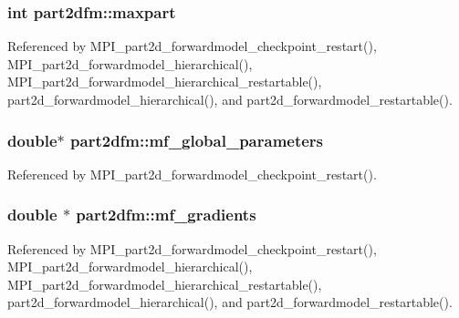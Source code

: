 \subsubsection[{\texorpdfstring{maxpart}{maxpart}}]{\setlength{\rightskip}{0pt plus 5cm}int part2dfm\+::maxpart}\hypertarget{structpart2dfm_a4bf2b8b0f9a31d52a4640b5d9e0154ab}{}\label{structpart2dfm_a4bf2b8b0f9a31d52a4640b5d9e0154ab}


Referenced by M\+P\+I\+\_\+part2d\+\_\+forwardmodel\+\_\+checkpoint\+\_\+restart(), M\+P\+I\+\_\+part2d\+\_\+forwardmodel\+\_\+hierarchical(), M\+P\+I\+\_\+part2d\+\_\+forwardmodel\+\_\+hierarchical\+\_\+restartable(), part2d\+\_\+forwardmodel\+\_\+hierarchical(), and part2d\+\_\+forwardmodel\+\_\+restartable().

\subsubsection[{\texorpdfstring{mf\+\_\+global\+\_\+parameters}{mf_global_parameters}}]{\setlength{\rightskip}{0pt plus 5cm}double$\ast$ part2dfm\+::mf\+\_\+global\+\_\+parameters}\hypertarget{structpart2dfm_aafdf454cb831c2069921c101fdef9eee}{}\label{structpart2dfm_aafdf454cb831c2069921c101fdef9eee}


Referenced by M\+P\+I\+\_\+part2d\+\_\+forwardmodel\+\_\+checkpoint\+\_\+restart().

\subsubsection[{\texorpdfstring{mf\+\_\+gradients}{mf_gradients}}]{\setlength{\rightskip}{0pt plus 5cm}double $\ast$ part2dfm\+::mf\+\_\+gradients}\hypertarget{structpart2dfm_a3f37e5875df194098a83a1013b2c28a7}{}\label{structpart2dfm_a3f37e5875df194098a83a1013b2c28a7}


Referenced by M\+P\+I\+\_\+part2d\+\_\+forwardmodel\+\_\+checkpoint\+\_\+restart(), M\+P\+I\+\_\+part2d\+\_\+forwardmodel\+\_\+hierarchical(), M\+P\+I\+\_\+part2d\+\_\+forwardmodel\+\_\+hierarchical\+\_\+restartable(), part2d\+\_\+forwardmodel\+\_\+hierarchical(), and part2d\+\_\+forwardmodel\+\_\+restartable().

